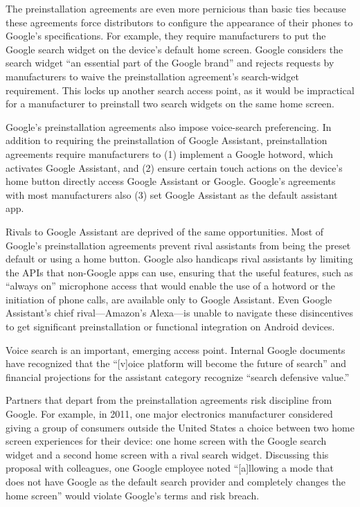 \documentclass[11pt,b5paper,headings=small]{scrartcl}
\begin{document}
\begin{enumerate}

The preinstallation agreements are even more pernicious than basic ties because
these agreements force distributors to configure the appearance of their phones to Google’s
specifications. For example, they require manufacturers to put the Google search widget on the
device’s default home screen. Google considers the search widget “an essential part of the
Google brand” and rejects requests by manufacturers to waive the preinstallation agreement’s
search-widget requirement. This locks up another search access point, as it would be impractical
for a manufacturer to preinstall two search widgets on the same home screen.


Google’s preinstallation agreements also impose voice-search preferencing. In
addition to requiring the preinstallation of Google Assistant, preinstallation agreements require
manufacturers to (1) implement a Google hotword, which activates Google Assistant, and
(2) ensure certain touch actions on the device’s home button directly access Google Assistant or
Google. Google’s agreements with most manufacturers also (3) set Google Assistant as the
default assistant app.


Rivals to Google Assistant are deprived of the same opportunities. Most of
Google’s preinstallation agreements prevent rival assistants from being the preset default or
using a home button. Google also handicaps rival assistants by limiting the APIs that non-Google
apps can use, ensuring that the useful features, such as “always on” microphone access that
would enable the use of a hotword or the initiation of phone calls, are available only to Google
Assistant. Even Google Assistant’s chief rival—Amazon’s Alexa—is unable to navigate these
disincentives to get significant preinstallation or functional integration on Android devices.


Voice search is an important, emerging access point. Internal Google documents
have recognized that the “[v]oice platform will become the future of search” and financial
projections for the assistant category recognize “search defensive value.”


Partners that depart from the preinstallation agreements risk discipline from
Google. For example, in 2011, one major electronics manufacturer considered giving a group of
consumers outside the United States a choice between two home screen experiences for their
device: one home screen with the Google search widget and a second home screen with a rival
search widget. Discussing this proposal with colleagues, one Google employee noted “[a]llowing
a mode that does not have Google as the default search provider and completely changes the
home screen” would violate Google’s terms and risk breach.


\end{enumerate}
\end{document}
